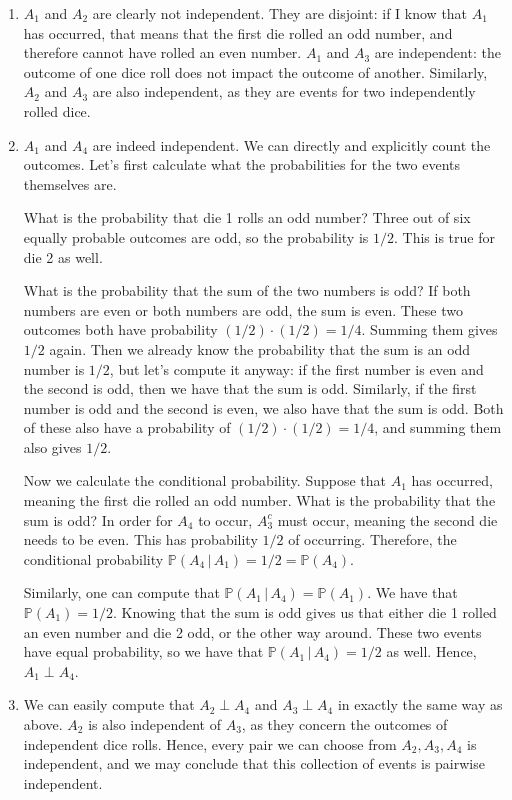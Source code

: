 \documentclass[11pt,letterpaper]{article}
\begin{document}
\begin{enumerate}[label=\alph*.]

  
\item $A_1$ and $A_2$ are clearly not independent. They are disjoint: if I know that $A_1$ has occurred, that means that the first die rolled an odd number, and therefore cannot have rolled an even number. $A_1$ and $A_3$ are independent: the outcome of one dice roll does not impact the outcome of another. Similarly, $A_2$ and $A_3$ are also independent, as they are events for two independently rolled dice.

  
\item $A_1$ and $A_4$ are indeed independent. We can directly and explicitly count the outcomes. Let's first calculate what the probabilities for the two events themselves are.

What is the probability that die 1 rolls an odd number? Three out of six equally probable outcomes are odd, so the probability is $1/2$. This is true for die 2 as well.

What is the probability that the sum of the two numbers is odd? If both numbers are even or both numbers are odd, the sum is even. These two outcomes both have probability $(1/2) \cdot (1/2) = 1/4$. Summing them gives $1/2$ again. Then we already know the probability that the sum is an odd number is $1/2$, but let's compute it anyway: if the first number is even and the second is odd, then we have that the sum is odd. Similarly, if the first number is odd and the second is even, we also have that the sum is odd. Both of these also have a probability of $(1/2) \cdot (1/2) = 1/4$, and summing them also gives $1/2$.

Now we calculate the conditional probability. Suppose that $A_1$ has occurred, meaning the first die rolled an odd number. What is the probability that the sum is odd? In order for $A_4$ to occur, $A_3^c$ must occur, meaning the second die needs to be even. This has probability $1/2$ of occurring. Therefore, the conditional probability $\mathbb P(A_4 \,|\, A_1) = 1/2 = \mathbb P(A_4)$.

Similarly, one can compute that $\mathbb P(A_1 \,|\, A_4) = \mathbb P(A_1)$. We have that $\mathbb P(A_1) = 1/2$. Knowing that the sum is odd gives us that either die 1 rolled an even number and die 2 odd, or the other way around. These two events have equal probability, so we have that $\mathbb P(A_1 \,|\, A_4) = 1/2$ as well. Hence, $A_1 \perp A_4$.

  
\item We can easily compute that $A_2 \perp A_4$ and $A_3 \perp A_4$ in exactly the same way as above. $A_2$ is also independent of $A_3$, as they concern the outcomes of independent dice rolls. Hence, every pair we can choose from $A_2, A_3, A_4$ is independent, and we may conclude that this collection of events is pairwise independent.


\end{enumerate}
\end{document}
